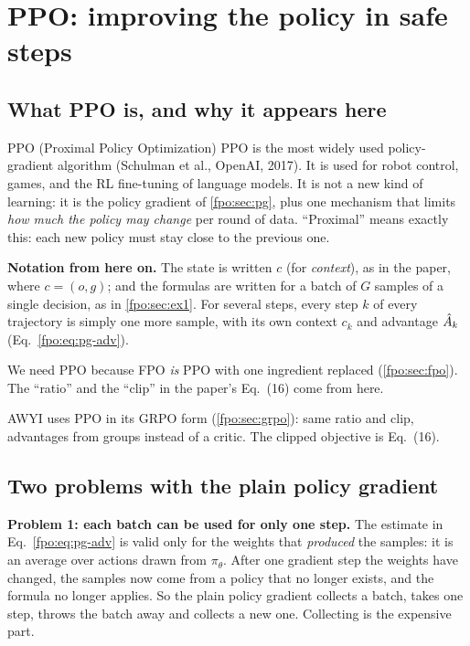 \section{PPO: improving the policy in safe steps}\label{fpo:sec:ppo}

\subsection{What PPO is, and why it appears here}
\begin{newc}{PPO (Proximal Policy Optimization)}
PPO is the most widely used policy-gradient algorithm (Schulman et al., OpenAI, 2017). It is used for robot control, games, and the RL fine-tuning of language models. It is not a new kind of learning: it is the policy gradient of \cref{fpo:sec:pg}, plus one mechanism that limits \emph{how much the policy may change} per round of data. ``Proximal'' means exactly this: each new policy must stay close to the previous one.
\end{newc}
\textbf{Notation from here on.} The state is written $c$ (for \emph{context}), as in the paper, where $c=(o,g)$; and the formulas are written for a batch of $G$ samples of a single decision, as in \cref{fpo:sec:ex1}. For several steps, every step $k$ of every trajectory is simply one more sample, with its own context $c_k$ and advantage $\hat A_k$ (Eq.~\eqref{fpo:eq:pg-adv}).

We need PPO because FPO \emph{is} PPO with one ingredient replaced (\cref{fpo:sec:fpo}). The ``ratio'' and the ``clip'' in the paper's Eq.~(16) come from here.

\begin{paperlink}
AWYI uses PPO in its GRPO form (\cref{fpo:sec:grpo}): same ratio and clip, advantages from groups instead of a critic. The clipped objective is Eq.~(16).
\end{paperlink}

\subsection{Two problems with the plain policy gradient}
\textbf{Problem 1: each batch can be used for only one step.} The estimate in Eq.~\eqref{fpo:eq:pg-adv} is valid only for the weights that \emph{produced} the samples: it is an average over actions drawn from $\pi_\theta$. After one gradient step the weights have changed, the samples now come from a policy that no longer exists, and the formula no longer applies. So the plain policy gradient collects a batch, takes one step, throws the batch away and collects a new one. Collecting is the expensive part.

